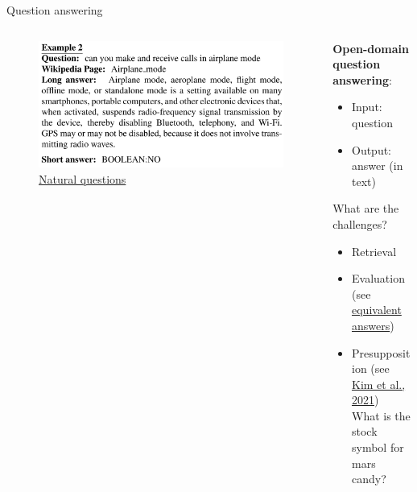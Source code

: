 \documentclass[usenames,dvipsnames,notes,11pt,aspectratio=169,hyperref={colorlinks=true, linkcolor=blue}]{beamer}
\newcommand{\pdfnote}[1]{}
\begin{document}
\begin{frame}
    {Question answering}
    \begin{columns}
        \begin{column}{0.5\textwidth}
            \begin{figure}
                \includegraphics[height=0.5\textwidth]{figures/nq}
                \caption{\href{https://aclanthology.org/Q19-1026.pdf}{Natural questions}}
            \end{figure}
        \end{column}
        \begin{column}{0.5\textwidth}
            \textbf{Open-domain question answering}:\\
            \begin{itemize}
                \item[] Input: question
                \item[] Output: answer (in text)
            \end{itemize}

            \bigskip
            What are the challenges?\\\pause
            \begin{itemize}
                \item Retrieval
                \item Evaluation (see \href{https://arxiv.org/abs/2109.05289}{equivalent answers})
                \item Presupposition (see \href{https://aclanthology.org/2021.acl-long.304.pdf}{Kim et al., 2021})\\
                    What is the stock symbol for mars candy?
                    \pdfnote{mars is not a publicly traded company}
            \end{itemize}
        \end{column}
    \end{columns}
\end{frame}
\end{document}
